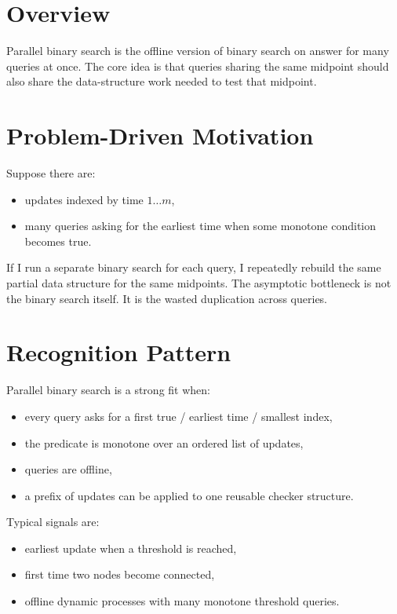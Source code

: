 \section*{Overview}

Parallel binary search is the offline version of binary search on answer for many queries at once. The core idea is that
queries sharing the same midpoint should also share the data-structure work needed to test that midpoint.

\section*{Problem-Driven Motivation}

Suppose there are:

\begin{itemize}
  \item updates indexed by time \(1 \dots m\),
  \item many queries asking for the earliest time when some monotone condition becomes true.
\end{itemize}

If I run a separate binary search for each query, I repeatedly rebuild the same partial data structure for the same
midpoints. The asymptotic bottleneck is not the binary search itself. It is the wasted duplication across queries.

\section*{Recognition Pattern}

Parallel binary search is a strong fit when:

\begin{itemize}
  \item every query asks for a first true / earliest time / smallest index,
  \item the predicate is monotone over an ordered list of updates,
  \item queries are offline,
  \item a prefix of updates can be applied to one reusable checker structure.
\end{itemize}

Typical signals are:

\begin{itemize}
  \item earliest update when a threshold is reached,
  \item first time two nodes become connected,
  \item offline dynamic processes with many monotone threshold queries.
\end{itemize}

